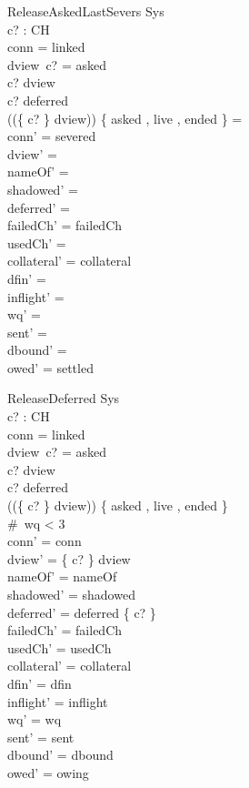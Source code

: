 \documentclass[a4paper,10pt,fleqn]{article}
\begin{document}
\begin{schema}{ReleaseAskedLastSevers}
  \Delta Sys \\
  c? : CH \\
\where
  conn = linked \\
  dview~c? = asked \\
  c? \in \dom dview \\
  c? \notin deferred \\
  (\ran (\{ c? \} \ndres dview)) \cap \{ asked , live , ended \} = \emptyset \\
  conn' = severed \\
  dview' = \emptyset \\
  nameOf' = \emptyset \\
  shadowed' = \emptyset \\
  deferred' = \emptyset \\
  failedCh' = failedCh \\
  usedCh' = \emptyset \\
  collateral' = collateral \\
  dfin' = \emptyset \\
  inflight' = \langle \rangle \\
  wq' = \langle \rangle \\
  sent' = \langle \rangle \\
  dbound' = \emptyset \\
  owed' = settled
\end{schema}

\begin{schema}{ReleaseDeferred}
  \Delta Sys \\
  c? : CH \\
\where
  conn = linked \\
  dview~c? = asked \\
  c? \in \dom dview \\
  c? \in deferred \\
  (\ran (\{ c? \} \ndres dview)) \cap \{ asked , live , ended \} \neq \emptyset \\
  \#~wq < 3 \\
  conn' = conn \\
  dview' = \{ c? \} \ndres dview \\
  nameOf' = nameOf \\
  shadowed' = shadowed \\
  deferred' = deferred \setminus \{ c? \} \\
  failedCh' = failedCh \\
  usedCh' = usedCh \\
  collateral' = collateral \\
  dfin' = dfin \\
  inflight' = inflight \\
  wq' = wq \\
  sent' = sent \\
  dbound' = dbound \\
  owed' = owing
\end{schema}
\end{document}
